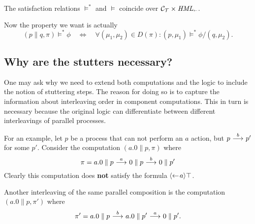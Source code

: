 \begin{remark}
    The satisfaction relations $\vDash^*$ and $\vDash$ coincide over $\mathcal{C}_{\mathcal{T}} \times \textit{HML}_\shortleftarrow$.
\end{remark}
Now the property we want is actually
\[
    (p\parallel q, \pi) \vDash^* \phi  \quad\Leftrightarrow\quad
    \forall (\mu_1,\mu_2)\in D(\pi) : (p, \mu_1) \vDash^* \phi/(q, \mu_2).
\]


\subsection{Why are the stutters necessary?}

One may ask why we need to extend both computations and the logic to include the
notion of stuttering steps. The reason for doing so is to capture the information
about interleaving order in component computations. This in turn is necessary because
the original logic can differentiate between different interleavings of parallel
processes.

For an example, let $p$ be a process that can not perform an $a$ action, but
$p\ {\stackrel{{b}}{\longrightarrow}}\  p'$ for some $p'$. Consider the computation $(a.0 \parallel p, \pi)$
where
\begin{equation}\label{eq:interleave1}
    \pi = a.0 \parallel p \ {\stackrel{{a}}{\longrightarrow}}\  0 \parallel p \ {\stackrel{{b}}{\longrightarrow}}\  0 \parallel p'
\end{equation}
Clearly this computation does {\bf not} satisfy the formula $\mbox{\ensuremath{\langle\leftarrow\! a \rangle}}\top$.

Another interleaving of the same parallel composition is the computation
$(a.0\parallel p, \pi')$ where
\begin{equation}\label{eq:interleave2}
    \pi' = a.0 \parallel p \ {\stackrel{{b}}{\longrightarrow}}\  a.0 \parallel p' \ {\stackrel{{a}}{\longrightarrow}}\  0\parallel p'.
\end{equation}


